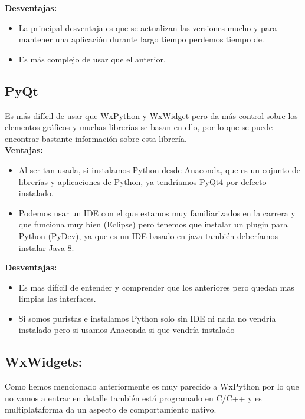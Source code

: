 \textbf{Desventajas:}

\begin{itemize}
\item La principal desventaja es que se actualizan las versiones mucho y para mantener una aplicación durante largo tiempo perdemos tiempo de.
\item Es más complejo de usar que el anterior.
\end{itemize}

\subsection{PyQt}
Es más difícil de usar que WxPython y WxWidget pero da más control sobre los elementos gráficos y muchas librerías se basan en ello, por lo que se puede encontrar bastante información sobre esta librería.
\\

\textbf{Ventajas:}

\begin{itemize}
\item Al ser tan usada, si instalamos Python desde Anaconda, que es un cojunto de librerías y aplicaciones de Python, ya tendríamos PyQt4 por defecto instalado.

\item Podemos usar un IDE con el que estamos muy familiarizados en la carrera y que funciona muy bien (Eclipse) pero tenemos que instalar un plugin para Python (PyDev), ya que es un IDE basado en java también deberíamos instalar Java 8.
\end{itemize}

\textbf{Desventajas:}

\begin{itemize}
\item Es mas difícil de entender y comprender que los anteriores pero quedan mas limpias las interfaces.
\item Si somos puristas e instalamos Python solo sin IDE ni nada no vendría instalado pero si usamos Anaconda si que vendría instalado
\end{itemize}

\subsection{WxWidgets:}
Como hemos mencionado anteriormente es muy parecido a WxPython por lo que no vamos a entrar en detalle también está programado en C/C++ y es multiplataforma da un aspecto de comportamiento nativo.
\\


